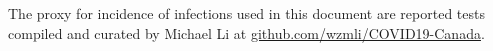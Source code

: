 

The proxy for incidence of infections used in this document are reported tests compiled and curated by Michael Li at \href{https://github.com/wzmli/COVID19-Canada}{github.com/wzmli/COVID19-Canada}.

